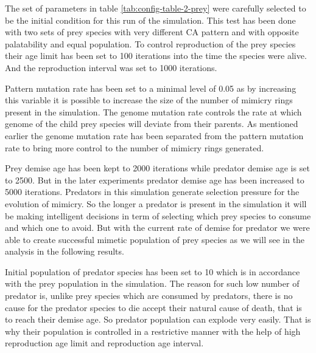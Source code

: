 The set of parameters in table \ref{tab:config-table-2-prey} were carefully selected to be the initial condition for this run of the simulation. This test has been done with two sets of prey species with very different CA pattern and with opposite palatability and equal population. To control reproduction of the prey species their age limit has been set to 100 iterations into the time the species were alive. And the reproduction interval was set to 1000 iterations.

Pattern mutation rate has been set to a minimal level of 0.05 as by increasing this variable it is possible to increase the size of the number of mimicry rings present in the simulation. The genome mutation rate controls the rate at which genome of the child prey species will deviate from their parents. As mentioned earlier the genome mutation rate has been separated from the pattern mutation rate to bring more control to the number of mimicry rings generated.

Prey demise age has been kept to 2000 iterations while predator demise age is set to 2500. But in the later experiments predator demise age has been increased to 5000 iterations. Predators in this simulation generate selection pressure for the evolution of mimicry. So the longer a predator is present in the simulation it will be making intelligent decisions in term of selecting which prey species to consume and which one to avoid. But with the current rate of demise for predator we were able to create successful mimetic population of prey species as we will see in the analysis in the following results.

Initial population of predator species has been set to 10 which is in accordance with the prey population in the simulation. The reason for such low number of predator is, unlike prey species which are consumed by predators, there is no cause for the predator species to die accept their natural cause of death, that is to reach their demise age. So predator population can explode very easily. That is why their population is controlled in a restrictive manner with the help of high reproduction age limit and reproduction age interval.

